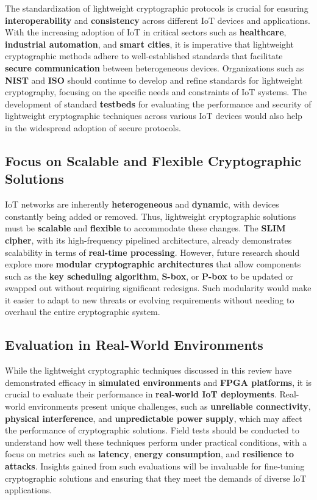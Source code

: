 \documentclass{article}
\begin{document}
The standardization of lightweight cryptographic protocols is crucial for ensuring \textbf{interoperability} and \textbf{consistency} across different IoT devices and applications. With the increasing adoption of IoT in critical sectors such as \textbf{healthcare}, \textbf{industrial automation}, and \textbf{smart cities}, it is imperative that lightweight cryptographic methods adhere to well-established standards that facilitate \textbf{secure communication} between heterogeneous devices. Organizations such as \textbf{NIST} and \textbf{ISO} should continue to develop and refine standards for lightweight cryptography, focusing on the specific needs and constraints of IoT systems. The development of standard \textbf{testbeds} for evaluating the performance and security of lightweight cryptographic techniques across various IoT devices would also help in the widespread adoption of secure protocols.

\subsection{Focus on Scalable and Flexible Cryptographic Solutions}

IoT networks are inherently \textbf{heterogeneous} and \textbf{dynamic}, with devices constantly being added or removed. Thus, lightweight cryptographic solutions must be \textbf{scalable} and \textbf{flexible} to accommodate these changes. The \textbf{SLIM cipher}, with its high-frequency pipelined architecture, already demonstrates scalability in terms of \textbf{real-time processing}. However, future research should explore more \textbf{modular cryptographic architectures} that allow components such as the \textbf{key scheduling algorithm}, \textbf{S-box}, or \textbf{P-box} to be updated or swapped out without requiring significant redesigns. Such modularity would make it easier to adapt to new threats or evolving requirements without needing to overhaul the entire cryptographic system.

\subsection{Evaluation in Real-World Environments}

While the lightweight cryptographic techniques discussed in this review have demonstrated efficacy in \textbf{simulated environments} and \textbf{FPGA platforms}, it is crucial to evaluate their performance in \textbf{real-world IoT deployments}. Real-world environments present unique challenges, such as \textbf{unreliable connectivity}, \textbf{physical interference}, and \textbf{unpredictable power supply}, which may affect the performance of cryptographic solutions. Field tests should be conducted to understand how well these techniques perform under practical conditions, with a focus on metrics such as \textbf{latency}, \textbf{energy consumption}, and \textbf{resilience to attacks}. Insights gained from such evaluations will be invaluable for fine-tuning cryptographic solutions and ensuring that they meet the demands of diverse IoT applications.
\end{document}
